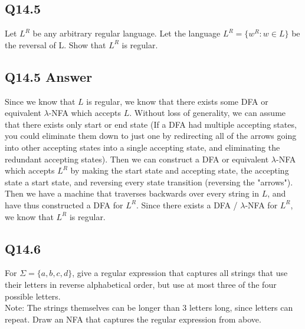 \documentclass{article}
\begin{document}
\subsection*{Q14.5}
Let $L^R$ be any arbitrary regular language. Let the language $L^R = \{w^R : w \in L\}$ be the reversal of L.
Show that $L^R$ is regular.
\newpage
\subsection*{Q14.5 Answer}
Since we know that $L$ is regular, we know that there exists some DFA or equivalent $\lambda$-NFA which accepts $L$. Without loss of generality, we can
assume that there exists only start or end state (If a DFA had multiple accepting states, you could eliminate them down to just one 
by redirecting all of the arrows going into other accepting states into a single accepting state, and eliminating the redundant accepting
states). Then we can construct a DFA or equivalent $\lambda$-NFA which accepts $L^R$ by making the start state and accepting state, the accepting state
a start state, and reversing every state transition (reversing the "arrows"). Then we have a machine that traverses backwards over every
string in $L$, and have thus constructed a DFA for $L^R$. Since there exists a DFA / $\lambda$-NFA for $L^R$, we know that $L^R$ is regular.
\newpage

\subsection*{Q14.6}
For $\Sigma=\{a,b,c,d\}$, give a regular expression that captures all strings that use their letters in reverse alphabetical order, but use at most three of the four possible letters.
\\ Note: The strings themselves can be longer than 3 letters long, since letters can repeat.
 Draw an NFA that captures the regular expression from above.
\newpage
\end{document}
